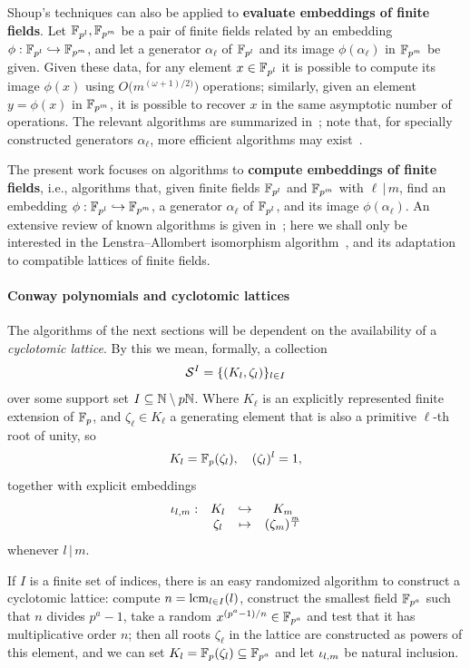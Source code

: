 \documentclass[sigconf]{acmart}
\begin{document}
Shoup's techniques can also be applied to \textbf{evaluate embeddings
  of finite fields}. %
Let $\mathbb{F}_{p^l},\mathbb{F}_{p^m}$ be a pair of finite fields related by an
embedding $\phi:\mathbb{F}_{p^l}\hookrightarrow\mathbb{F}_{p^m}$, and let a
generator $\alpha_\ell$ of $\mathbb{F}_{p^l}$ and its image
$\phi(\alpha_\ell)$ in $\mathbb{F}_{p^m}$ be given. %
Given these data, for any element $x\in\mathbb{F}_{p^l}$ it is possible to
compute its image $\phi(x)$ using $O\bigl(m^{(\omega+1)/2)}\bigr)$
operations; similarly, given an element $y=\phi(x)$ in $\mathbb{F}_{p^m}$, it
is possible to recover $x$ in the same asymptotic number of
operations. %
The relevant algorithms are summarized in~\cite[Sec.~6]{ffisom-long};
note that, for specially constructed generators $\alpha_\ell$, more
efficient algorithms may
exist~\cite{df+schost12,DoSc12,DeDoSc13,DeDoSc2014}.

The present work focuses on algorithms to \textbf{compute embeddings
  of finite fields}, i.e., algorithms that, given finite fields
$\mathbb{F}_{p^l}$ and $\mathbb{F}_{p^m}$ with $\ell\,|\,m$, find an embedding
$\phi:\mathbb{F}_{p^l}\hookrightarrow\mathbb{F}_{p^m}$, a generator $\alpha_\ell$
of $\mathbb{F}_{p^l}$, and its image $\phi(\alpha_\ell)$. %
An extensive review of known algorithms is given
in~\cite{brieulle2018computing}; here we shall only be interested in
the Lenstra--Allombert isomorphism
algorithm~\cite{LenstraJr91,Allombert02}, and its adaptation to
compatible lattices of finite fields.


\paragraph{Conway polynomials and cyclotomic lattices}
The algorithms of the next sections will be dependent on the
availability of a \emph{cyclotomic lattice}. %
By this we mean, formally, a collection
\[ \mathcal{S}^{I}=\{(K_l,\zeta_l)\}_{l\in I} \]
over some support set $I\subseteq\mathbb{N}\setminus p\mathbb{N}$.
Where $K_\ell$ is an explicitly represented finite extension of $\mathbb{F}_p$,
and $\zeta_\ell\in K_\ell$ a generating element that is also a primitive $\ell$-th root
of unity,
so \[ K_l=\mathbb{F}_p(\zeta_l),\quad(\zeta_l)^l=1, \]
together with
explicit embeddings
\[
\begin{array}{cccc}
  {\iota_{{l},{m}}}: & K_l & \hookrightarrow & K_m \\
  & \zeta_l & \mapsto & (\zeta_{m})^{\frac{m}{l}}
\end{array}
\]
whenever $l\,|\,m$.

If $I$ is a finite set of indices, there is an easy randomized
algorithm to construct a cyclotomic lattice: compute
$n=\operatorname{lcm}_{l\in I}(l)$, construct the smallest field $\mathbb{F}_{p^a}$ such
that $n$ divides $p^a-1$, take a random $x^{(p^a-1)/n}\in\mathbb{F}_{p^a}$ and
test that it has multiplicative order $n$;
then all roots $\zeta_\ell$ in the
lattice are constructed as powers of this element,
and we can set $K_l=\mathbb{F}_p(\zeta_l)\subseteq\mathbb{F}_{p^a}$
and let ${\iota_{{l},{m}}}$ be natural inclusion.
\end{document}

